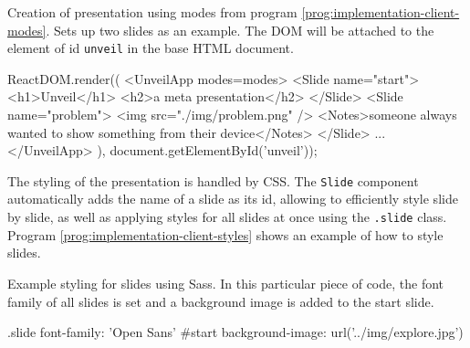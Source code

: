 \begin{program}
\caption{Creation of presentation using modes from program \ref{prog:implementation-client-modes}. Sets up two slides as an example. The DOM will be attached to the element of id \texttt{unveil} in the base HTML document.}
\label{prog:implementation-client-presentation}
\begin{JsCode}
ReactDOM.render((
  <UnveilApp modes={modes}>
    <Slide name="start">
      <h1>Unveil</h1>
      <h2>a meta presentation</h2>
    </Slide>
    <Slide name="problem">
      <img src="./img/problem.png" />
      <Notes>someone always wanted to show something from their device</Notes>
    </Slide>
    ...
  </UnveilApp>
), document.getElementById('unveil'));
\end{JsCode}
\end{program}

The styling of the presentation is handled by CSS. The \texttt{Slide} component automatically adds the name of a slide as its id, allowing to efficiently style slide by slide, as well as applying styles for all slides at once using the \texttt{.slide} class. Program \ref{prog:implementation-client-styles} shows an example of how to style slides.

\begin{program}
\caption{Example styling for slides using Sass. In this particular piece of code, the font family of all slides is set and a background image is added to the start slide.}
\label{prog:implementation-client-styles}
\begin{CssCode}
  .slide
    font-family: 'Open Sans'
  #start
    background-image: url('../img/explore.jpg')
\end{CssCode}
\end{program}